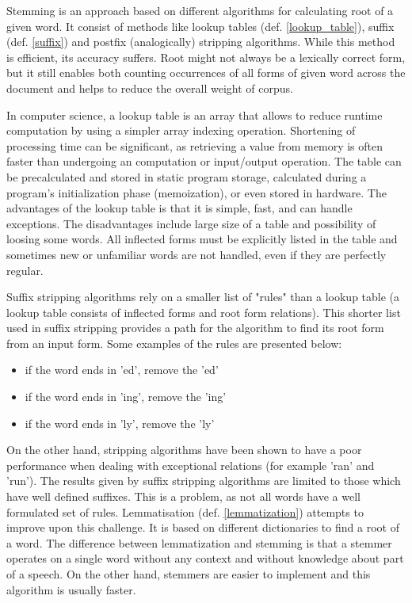Stemming is an approach based on different algorithms for calculating root of a given word. It consist of methods like lookup tables (def. \ref{lookup_table}), suffix (def. \ref{suffix}) and postfix (analogically) stripping algorithms. While this method is efficient, its accuracy suffers. Root might not always be a lexically correct form, but it still enables both counting occurrences of all forms of given word across the document and helps to reduce the overall weight of corpus.

 \begin{definition}
 	\label{lookup_table}
In computer science, a lookup table is an array that allows to reduce runtime computation by using a simpler array indexing operation. Shortening of processing time can be significant, as retrieving a value from memory is often faster than undergoing an computation or input/output operation. The table can be precalculated and stored in static program storage, calculated during a program's initialization phase (memoization), or even stored in hardware.
The advantages of the lookup table is that it is simple, fast, and can handle exceptions. The disadvantages include large size of a table and possibility of loosing some words. All inflected forms must be explicitly listed in the table and sometimes new or unfamiliar words are not handled, even if they are perfectly regular. 
\end{definition}

 \begin{definition}
 	\label{suffix}
Suffix stripping algorithms rely on a smaller list of "rules" than a lookup table (a lookup table consists of inflected forms and root form relations). This shorter list used in suffix stripping provides a path for the algorithm to find its root form from an input form. Some examples of the rules are presented below:
\begin{itemize}
	\item if the word ends in 'ed', remove the 'ed'
	\item if the word ends in 'ing', remove the 'ing'
	\item if the word ends in 'ly', remove the 'ly'
\end{itemize}
 \end{definition}

 On the other hand, stripping algorithms have been shown to have a poor performance when dealing with exceptional relations (for example 'ran' and 'run'). The results given by suffix stripping algorithms are limited to those which have well defined suffixes. This is a problem, as not all words have a well formulated set of rules. Lemmatisation (def. \ref{lemmatization}) attempts to improve upon this challenge.
It is based on different dictionaries to find a root of a word. The difference between lemmatization and stemming is that a stemmer operates on a single word without any context and without knowledge about part of a speech. On the other hand, stemmers are easier to implement and this algorithm is usually faster.

